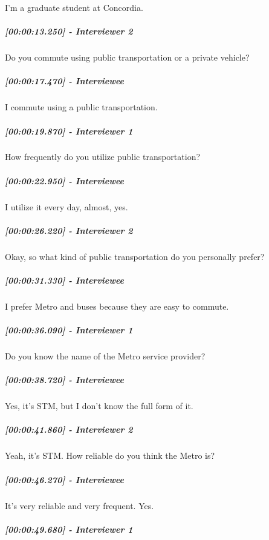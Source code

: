 \documentclass[a4paper,12pt]{article}
\begin{document}
I'm a graduate student at Concordia.

\hypertarget{interviewer-2-2}{%
\subparagraph{{[}00:00:13.250{]} - Interviewer
2}\label{interviewer-2-2}}

Do you commute using public transportation or a private vehicle?

\hypertarget{interviewee-3}{%
\subparagraph{{[}00:00:17.470{]} - Interviewee}\label{interviewee-3}}

I commute using a public transportation.

\hypertarget{interviewer-1-1}{%
\subparagraph{{[}00:00:19.870{]} - Interviewer
1}\label{interviewer-1-1}}

How frequently do you utilize public transportation?

\hypertarget{interviewee-4}{%
\subparagraph{{[}00:00:22.950{]} - Interviewee}\label{interviewee-4}}

I utilize it every day, almost, yes.

\hypertarget{interviewer-2-3}{%
\subparagraph{{[}00:00:26.220{]} - Interviewer
2}\label{interviewer-2-3}}

Okay, so what kind of public transportation do you personally prefer?

\hypertarget{interviewee-5}{%
\subparagraph{{[}00:00:31.330{]} - Interviewee}\label{interviewee-5}}

I prefer Metro and buses because they are easy to commute.

\hypertarget{interviewer-1-2}{%
\subparagraph{{[}00:00:36.090{]} - Interviewer
1}\label{interviewer-1-2}}

Do you know the name of the Metro service provider?

\hypertarget{interviewee-6}{%
\subparagraph{{[}00:00:38.720{]} - Interviewee}\label{interviewee-6}}

Yes, it's STM, but I don't know the full form of it.

\hypertarget{interviewer-2-4}{%
\subparagraph{{[}00:00:41.860{]} - Interviewer
2}\label{interviewer-2-4}}

Yeah, it's STM. How reliable do you think the Metro is?

\hypertarget{interviewee-7}{%
\subparagraph{{[}00:00:46.270{]} - Interviewee}\label{interviewee-7}}

It's very reliable and very frequent. Yes.

\hypertarget{interviewer-1-3}{%
\subparagraph{{[}00:00:49.680{]} - Interviewer
1}\label{interviewer-1-3}}
\end{document}
